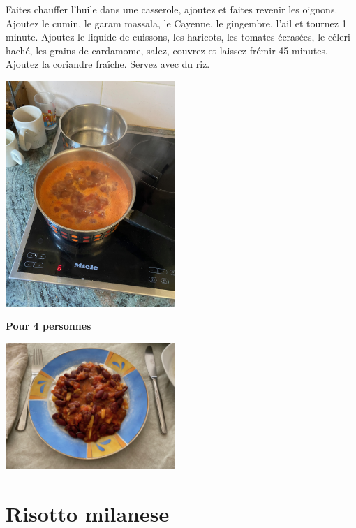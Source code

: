 \documentclass[10pt,a4paper]{report}
\begin{document}
\begin{multicols}{2}
        Faites chauffer l'huile dans une casserole, ajoutez et faites revenir les oignons. Ajoutez le cumin, le garam massala, le Cayenne, le gingembre, l'ail et tournez 1 minute. Ajoutez le liquide de cuissons, les haricots, les tomates écrasées, le céleri haché, les grains de cardamome, salez, couvrez et laissez frémir 45 minutes. Ajoutez la coriandre fraîche. Servez avec du riz.
        \newline
        \newline
        \centerline{\includegraphics[width=0.48\textwidth]{./assets/curry_de_haricots}}
        \newline
        \newline
        \textbf{Pour 4 personnes}
        \newline
        \newline
        \centerline{\includegraphics[width=0.48\textwidth]{./assets/curry_de_haricots_fin}}
    \end{multicols}
    \newpage

    \section{Risotto milanese}
\end{document}
